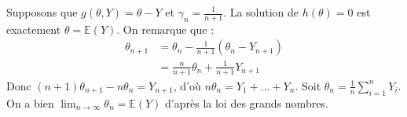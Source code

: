 \begin{example}
    Supposons que $ g( \theta, Y) = \theta - Y$ et $ \gamma_n = \frac{1}{n+1}$.
    La solution de $h( \theta) = 0$ est exactement $ \theta = \mathbb{E}(Y)$.
    On remarque que : 
        \begin{align*}
            \theta_{n+1} &= \theta_n - \frac{1}{n+1} \left( \theta_n - Y_{n+1} \right) \\ 
            &= \frac{n}{n+1} \theta_n + \frac{1}{n+1} Y_{n+1} 
        \end{align*}
    Donc $ (n+1) \theta_{n+1} - n \theta_n = Y_{n+1}$, d'où $ n \theta_n = Y_1 + \dots + Y_n$.
    Soit $ \theta_n = \frac{1}{n } \sum_{i=1}^{n} Y_i$. On a bien $ \lim_{n \to \infty} \theta_n = \mathbb{E}(Y)$ 
    d'après la loi des grands nombres.
\end{example}





